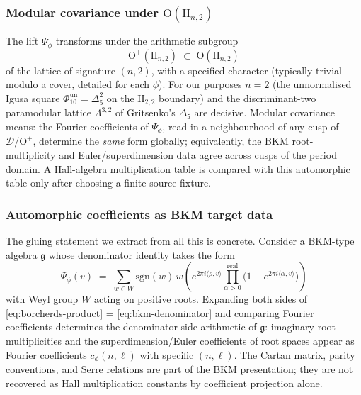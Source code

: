 \subsubsection{Modular covariance under $\mathrm{O}(\mathrm{II}_{n, 2})$}

The lift $\Psi_\phi$ transforms under the arithmetic subgroup
\[
 \mathrm{O}^+(\mathrm{II}_{n, 2}) \;\subset\; \mathrm{O}(\mathrm{II}_{n, 2})
\]
of the lattice of signature $(n, 2)$, with a specified character (typically trivial modulo a cover, detailed for each $\phi$). For our purposes $n = 2$ (the unnormalised Igusa square $\Phi_{10}^{\mathrm{un}}=\Delta_5^2$ on the $\mathrm{II}_{2, 2}$ boundary) and the discriminant-two paramodular lattice \(\Lambda^{3,2}\) of Gritsenko's $\Delta_5$ are decisive. Modular covariance means: the Fourier coefficients of $\Psi_\phi$, read in a neighbourhood of any cusp of $\mathcal D / \mathrm{O}^+$, determine the \emph{same} form globally; equivalently, the BKM root-multiplicity and Euler/superdimension data agree across cusps of the period domain. A Hall-algebra multiplication table is compared with this automorphic table only after choosing a finite source fixture.

\subsubsection{Automorphic coefficients as BKM target data}

The gluing statement we extract from all this is concrete. Consider a BKM-type algebra $\mathfrak g$ whose denominator identity takes the form
\begin{equation}
 \Psi_\phi(v) \;=\; \sum_{w \in W} \mathrm{sgn}(w) \, w\!\left(e^{2\pi i \langle \rho, v\rangle} \prod_{\alpha > 0}^{\mathrm{real}} \bigl(1 - e^{2\pi i \langle \alpha, v\rangle}\bigr)\right)
 \label{eq:bkm-denominator}
\end{equation}
with Weyl group $W$ acting on positive roots. Expanding both sides of \eqref{eq:borcherds-product} = \eqref{eq:bkm-denominator} and comparing Fourier coefficients determines the denominator-side arithmetic of $\mathfrak g$: imaginary-root multiplicities and the superdimension/Euler coefficients of root spaces appear as Fourier coefficients $c_\phi(n, \ell)$ with specific $(n, \ell)$. The Cartan matrix, parity conventions, and Serre relations are part of the BKM presentation; they are not recovered as Hall multiplication constants by coefficient projection alone.

